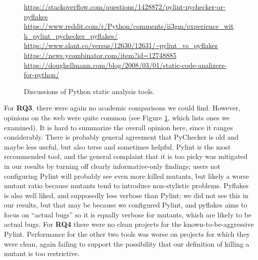 \begin{figure}
  {\scriptsize
    \raggedright
  \url{https://stackoverflow.com/questions/1428872/pylint-pychecker-or-pyflakes}\\
  \url{https://www.reddit.com/r/Python/comments/ii3gm/experience_with_pylint_pychecker_pyflakes/}\\
  \url{https://www.slant.co/versus/12630/12631/~pylint_vs_pyflakes}\\
  \url{https://news.ycombinator.com/item?id=12748885}\\
  \url{https://doughellmann.com/blog/2008/03/01/static-code-analizers-for-python/}\\
  }
\caption{Discussions of Python static analysis tools.}
\label{fig:blogpython}
\end{figure}

For {\bf RQ3}, there were again no academic comparisons we could find.  However, opinions on the web were quite common (see Figure \ref{fig:blogpython}, which lists ones we examined).  It is hard to summarize the overall opinion here, since it ranges considerably.  There is probably general agreement that PyChecker is old and maybe less useful, but also terse and sometimes helpful.  Pylint is the most recommended tool, and the general complaint that it is too picky was mitigated in our results by turning off clearly informative-only findings; users not configuring Pylint will probably see even more killed mutants, but likely a worse mutant ratio because mutants tend to introduce non-stylistic problems.  Pyflakes is also well liked, and supposedly less verbose than Pylint; we did not see this in our results, but that may be because we configured Pylint, and pyflakes aims to focus on ``actual bugs'' so it is equally verbose for mutants, which are likely to be actual bugs.
For {\bf RQ4} there were no clean projects for the known-to-be-aggressive Pylint.  Performance for the other two tools was worse on projects for which they were clean, again failing to support the possibility that our definition of killing a mutant is too restrictive.

